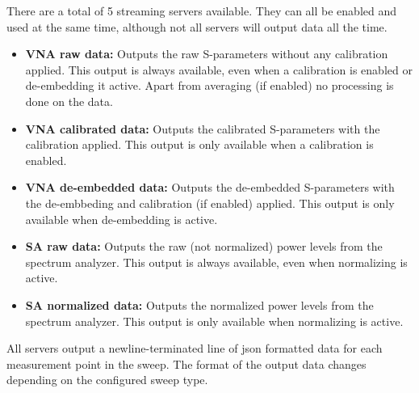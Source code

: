 \documentclass[a4paper,11pt]{article}
\begin{document}
There are a total of 5 streaming servers available. They can all be enabled and used at the same time, although not all servers will output data all the time.

\begin{itemize}
\item \textbf{VNA raw data:} Outputs the raw S-parameters without any calibration applied. This output is always available, even when a calibration is enabled or de-embedding it active. Apart from averaging (if enabled) no processing is done on the data.
\item \textbf{VNA calibrated data:} Outputs the calibrated S-parameters with the calibration applied. This output is only available when a calibration is enabled.
\item \textbf{VNA de-embedded data:} Outputs the de-embedded S-parameters with the de-embbeding and calibration (if enabled) applied. This output is only available when de-embedding is active.
\item \textbf{SA raw data:} Outputs the raw (not normalized) power levels from the spectrum analyzer. This output is always available, even when normalizing is active.
\item \textbf{SA normalized data:} Outputs the normalized power levels from the spectrum analyzer. This output is only available when normalizing is active.
\end{itemize}

\vspace{0.5cm}

All servers output a newline-terminated line of json formatted data for each measurement point in the sweep. The format of the output data changes depending on the configured sweep type.
\end{document}
